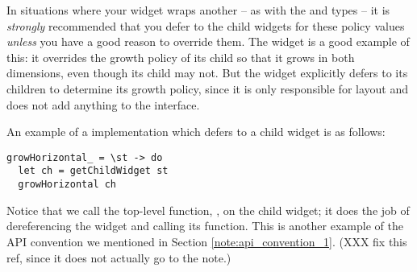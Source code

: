 In situations where your widget wraps another -- as with the 
and  types -- it is \textit{strongly} recommended that
you defer to the child widgets for these policy values \textit{unless}
you have a good reason to override them.  The  widget is
a good example of this: it overrides the growth policy of its child so
that it grows in both dimensions, even though its child may not.  But
the  widget explicitly defers to its children to determine its
growth policy, since it is only responsible for layout and does not
add anything to the interface.

An example of a  implementation which defers to a
child widget is as follows:

\begin{verbatim}
growHorizontal_ = \st -> do
  let ch = getChildWidget st
  growHorizontal ch
\end{verbatim}

Notice that we call the top-level function, , on
the child widget; it does the job of dereferencing the widget and
calling its  function.  This is another example
of the API convention we mentioned in Section
\ref{note:api_convention_1}. (XXX fix this ref, since it does not
actually go to the note.)
